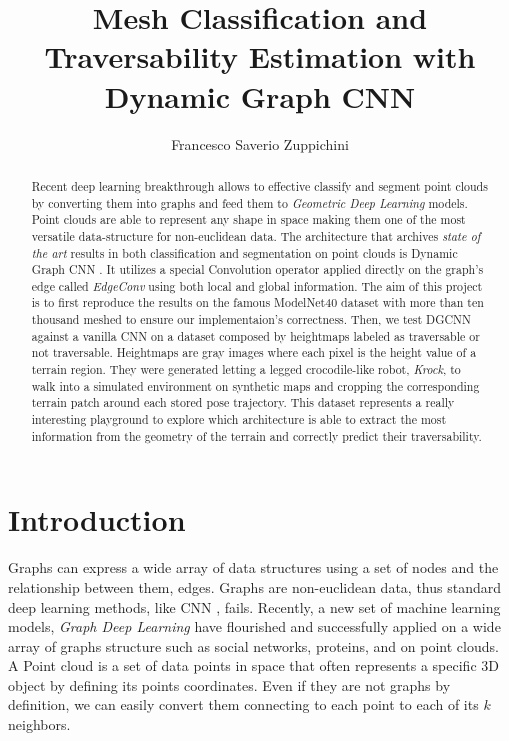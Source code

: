 \documentclass[twocolumn,showpacs,
  nofootinbib,aps,superscriptaddress,
  eqsecnum,prd,notitlepage,showkeys,10pt]{revtex4-1}
\begin{document}
\title{Mesh Classification and Traversability Estimation with Dynamic Graph CNN}
\author{Francesco Saverio Zuppichini}
\begin{abstract}
  Recent deep learning breakthrough allows to effective classify and segment point clouds by converting them into graphs and feed them to \emph{Geometric Deep Learning} models. Point clouds are able to represent any shape in space making them one of the most versatile data-structure for non-euclidean data. The architecture that archives \emph{state of the art} results in both classification and segmentation on point clouds is Dynamic Graph CNN \cite{dgcnn}. It utilizes a special Convolution operator applied directly on the graph's edge called \emph{EdgeConv} using both local and global information. The aim of this project is to first reproduce the results on the famous ModelNet40 \cite{shapenet} dataset with more than ten thousand meshed to ensure our implementaion's correctness.
  Then, we test DGCNN against a vanilla CNN on a dataset composed by heightmaps labeled as traversable or not traversable. Heightmaps are gray images where each pixel is the height value of a terrain region. They were generated letting a legged crocodile-like robot, \emph{Krock}, to walk into a simulated environment on synthetic maps and cropping the corresponding terrain patch around each stored pose trajectory. This dataset represents a really interesting playground to explore which architecture is able to extract the most information from the geometry of the terrain and correctly predict their traversability. 
\end{abstract}
\maketitle
\section{Introduction}

Graphs can express a wide array of data structures using a set of nodes and the relationship between them, edges. Graphs are non-euclidean data, thus standard deep learning methods, like CNN \cite{cnn}, fails. Recently, a new set of machine learning models, \emph{Graph Deep Learning} have flourished and successfully applied on a wide array of graphs structure such as social networks, proteins, and on point clouds. A Point cloud is a set of data points in space that often represents a specific 3D object by defining its points coordinates. Even if they are not graphs by definition, we can easily convert them connecting to each point to each of its $k$ neighbors.
\end{document}
